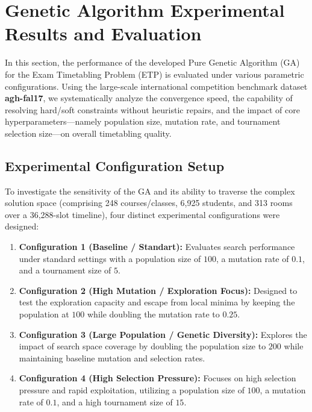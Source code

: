 
\section{Genetic Algorithm Experimental Results and Evaluation}
\label{sec:ga_experimental_results}

In this section, the performance of the developed Pure Genetic Algorithm (GA) for the Exam Timetabling Problem (ETP) is evaluated under various parametric configurations. Using the large-scale international competition benchmark dataset \textbf{agh-fal17}, we systematically analyze the convergence speed, the capability of resolving hard/soft constraints without heuristic repairs, and the impact of core hyperparameters—namely population size, mutation rate, and tournament selection size—on overall timetabling quality.

\subsection{Experimental Configuration Setup}
\label{subsec:experimental_configurations}

To investigate the sensitivity of the GA and its ability to traverse the complex solution space (comprising 248 courses/classes, 6,925 students, and 313 rooms over a 36,288-slot timeline), four distinct experimental configurations were designed:
\begin{enumerate}
    \item \textbf{Configuration 1 (Baseline / Standart):} Evaluates search performance under standard settings with a population size of $100$, a mutation rate of $0.1$, and a tournament size of $5$.
    \item \textbf{Configuration 2 (High Mutation / Exploration Focus):} Designed to test the exploration capacity and escape from local minima by keeping the population at $100$ while doubling the mutation rate to $0.25$.
    \item \textbf{Configuration 3 (Large Population / Genetic Diversity):} Explores the impact of search space coverage by doubling the population size to $200$ while maintaining baseline mutation and selection rates.
    \item \textbf{Configuration 4 (High Selection Pressure):} Focuses on high selection pressure and rapid exploitation, utilizing a population size of $100$, a mutation rate of $0.1$, and a high tournament size of $15$.
\end{enumerate}

